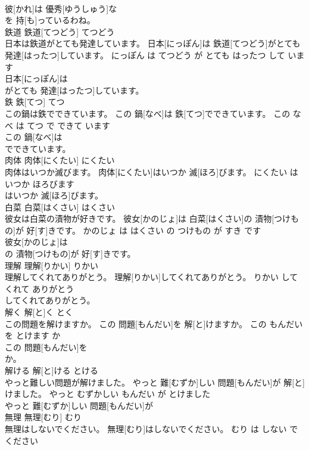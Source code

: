 \documentclass[8pt]{extreport}
\begin{document}
\begin{CJK}{UTF8}{min}
\\	彼[かれ]は 優秀[ゆうしゅう]な
\\	を 持[も]っているわね。			
\\	鉄道	鉄道[てつどう]	てつどう	
\\	日本は鉄道がとても発達しています。	日本[にっぽん]は 鉄道[てつどう]がとても 発達[はったつ]しています。	にっぽん は てつどう が とても はったつ して います	
\\	日本[にっぽん]は
\\	がとても 発達[はったつ]しています。			
\\	鉄	鉄[てつ]	てつ	
\\	この鍋は鉄でできています。	この 鍋[なべ]は 鉄[てつ]でできています。	この なべ は てつ で できて います	
\\	この 鍋[なべ]は
\\	でできています。			
\\	肉体	肉体[にくたい]	にくたい	
\\	肉体はいつか滅びます。	肉体[にくたい]はいつか 滅[ほろ]びます。	にくたい は いつか ほろびます	
\\	はいつか 滅[ほろ]びます。			
\\	白菜	白菜[はくさい]	はくさい	
\\	彼女は白菜の漬物が好きです。	彼女[かのじょ]は 白菜[はくさい]の 漬物[つけもの]が 好[す]きです。	かのじょ は はくさい の つけもの が すき です	
\\	彼女[かのじょ]は
\\	の 漬物[つけもの]が 好[す]きです。			
\\	理解	理解[りかい]	りかい	
\\	理解してくれてありがとう。	理解[りかい]してくれてありがとう。	りかい して くれて ありがとう	
\\	してくれてありがとう。			
\\	解く	解[と]く	とく	
\\	この問題を解けますか。	この 問題[もんだい]を 解[と]けますか。	この もんだい を とけます か	
\\	この 問題[もんだい]を
\\	か。			
\\	解ける	解[と]ける	とける	
\\	やっと難しい問題が解けました。	やっと 難[むずか]しい 問題[もんだい]が 解[と]けました。	やっと むずかしい もんだい が とけました	
\\	やっと 難[むずか]しい 問題[もんだい]が
\\	無理	無理[むり]	むり	
\\	無理はしないでください。	無理[むり]はしないでください。	むり は しない で ください	

\end{CJK}
\end{document}
